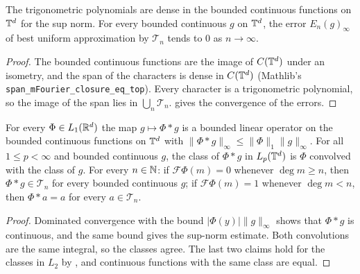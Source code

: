 \begin{lemma}
\label{lem:torus-uniform-density}
\leanok
{}
The trigonometric polynomials are dense in the bounded continuous functions on $\mathbb{T}^d$ for the
sup norm. For every bounded continuous $g$ on $\mathbb{T}^d$, the error $E_n(g)_\infty$ of best uniform
approximation by $\mathcal{T}_n$ tends to $0$ as $n \to \infty$.
\end{lemma}

\begin{proof}
\leanok
The bounded continuous functions are the image of $C(\mathbb{T}^d)$ under an isometry, and the span of
the characters is dense in $C(\mathbb{T}^d)$ (Mathlib's
\texttt{span\_\allowbreak mFourier\_\allowbreak closure\_\allowbreak eq\_\allowbreak top}). Every
character is a trigonometric polynomial, so the image of the span lies in
$\bigcup_n \mathcal{T}_n$.  gives the convergence of the errors.
\end{proof}

\begin{lemma}
\label{lem:torus-econv-continuous}
\leanok
{}
For every $\Phi \in L_1(\mathbb{R}^d)$ the map $g \mapsto \Phi * g$ is a bounded linear operator on the
bounded continuous functions on $\mathbb{T}^d$ with $\|\Phi * g\|_\infty \leq \|\Phi\|_1 \|g\|_\infty$.
For all $1 \leq p < \infty$ and bounded continuous $g$, the class of $\Phi * g$ in $L_p(\mathbb{T}^d)$
is $\Phi$ convolved with the class of $g$. For every $n \in \mathbb{N}$: if $\mathcal{F}\Phi(m) = 0$
whenever $\deg m \geq n$, then $\Phi * g \in \mathcal{T}_n$ for every bounded continuous $g$;
if $\mathcal{F}\Phi(m) = 1$ whenever $\deg m < n$, then $\Phi * a = a$ for every
$a \in \mathcal{T}_n$.
\end{lemma}

\begin{proof}
\leanok
Dominated convergence with the bound $|\Phi(y)| \|g\|_\infty$ shows that $\Phi * g$ is
continuous, and the same bound gives the sup-norm estimate. Both convolutions are the same
integral, so the classes agree. The last two claims hold for the classes in $L_2$ by
, and continuous functions with the same class are equal.
\end{proof}

